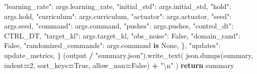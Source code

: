 \documentclass[
  chinese,
  11pt,
  letterpaper,
]{article}
\newenvironment{Shaded}{\begin{snugshade}}{\end{snugshade}}
\newcommand{\CharTok}[1]{\textcolor[rgb]{0.31,0.60,0.02}{#1}}
\newcommand{\ControlFlowTok}[1]{\textcolor[rgb]{0.13,0.29,0.53}{\textbf{#1}}}
\newcommand{\DecValTok}[1]{\textcolor[rgb]{0.00,0.00,0.81}{#1}}
\newcommand{\KeywordTok}[1]{\textcolor[rgb]{0.13,0.29,0.53}{\textbf{#1}}}
\newcommand{\NormalTok}[1]{#1}
\newcommand{\OperatorTok}[1]{\textcolor[rgb]{0.81,0.36,0.00}{\textbf{#1}}}
\newcommand{\StringTok}[1]{\textcolor[rgb]{0.31,0.60,0.02}{#1}}
\newcommand{\VariableTok}[1]{\textcolor[rgb]{0.00,0.00,0.00}{#1}}
\renewenvironment{Shaded}{\par\smallskip}{\par\smallskip}
\begin{document}
\begin{Shaded}
\begin{Highlighting}[]
            \StringTok{"learning\_rate"}\NormalTok{: args.learning\_rate,}
            \StringTok{"initial\_std"}\NormalTok{: args.initial\_std,}
            \StringTok{"hold"}\NormalTok{: args.hold,}
            \StringTok{"curriculum"}\NormalTok{: args.curriculum,}
            \StringTok{"actuator"}\NormalTok{: args.actuator,}
            \StringTok{"seed"}\NormalTok{: args.seed,}
            \StringTok{"command"}\NormalTok{: args.command,}
            \StringTok{"pushes"}\NormalTok{: args.pushes,}
            \StringTok{"control\_dt"}\NormalTok{: CTRL\_DT,}
            \StringTok{"target\_kl"}\NormalTok{: args.target\_kl,}
            \StringTok{"obs\_noise"}\NormalTok{: }\VariableTok{False}\NormalTok{,}
            \StringTok{"domain\_rand"}\NormalTok{: }\VariableTok{False}\NormalTok{,}
            \StringTok{"randomized\_commands"}\NormalTok{: args.command }\KeywordTok{is} \VariableTok{None}\NormalTok{,}
\NormalTok{        \},}
        \StringTok{"updates"}\NormalTok{: update\_metrics,}
\NormalTok{    \}}
\NormalTok{    (output }\OperatorTok{/} \StringTok{"summary.json"}\NormalTok{).write\_text(}
\NormalTok{        json.dumps(summary, indent}\OperatorTok{=}\DecValTok{2}\NormalTok{, sort\_keys}\OperatorTok{=}\VariableTok{True}\NormalTok{, allow\_nan}\OperatorTok{=}\VariableTok{False}\NormalTok{) }\OperatorTok{+} \StringTok{"}\CharTok{\textbackslash{}n}\StringTok{"}
\NormalTok{    )}
    \ControlFlowTok{return}\NormalTok{ summary}



\end{Highlighting}
\end{Shaded}
\end{document}
